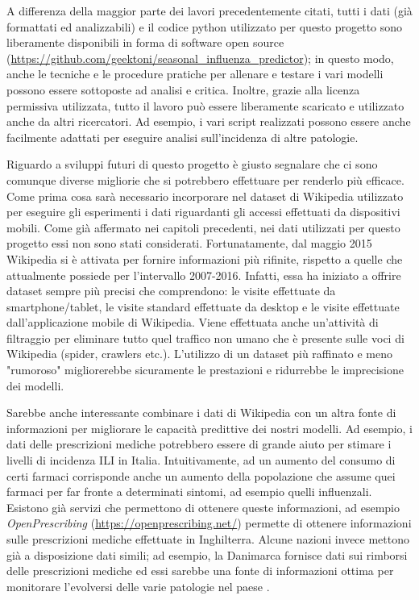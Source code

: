 A differenza della maggior parte dei lavori precedentemente citati, tutti i dati (già formattati ed analizzabili) e il codice 
python utilizzato per questo progetto sono liberamente disponibili in forma di software open source (\url{https://github.com/geektoni/seasonal_influenza_predictor}); in questo modo, 
anche le tecniche e le procedure pratiche per allenare e testare i vari modelli possono essere sottoposte ad analisi e 
critica. Inoltre, grazie alla licenza permissiva utilizzata, tutto il lavoro può essere liberamente scaricato e utilizzato 
anche da altri ricercatori. Ad esempio, i vari script realizzati possono essere anche facilmente adattati per eseguire
analisi sull'incidenza di altre patologie.
\bigskip

Riguardo a sviluppi futuri di questo progetto è giusto segnalare che ci sono comunque diverse migliorie che si potrebbero 
effettuare per renderlo più efficace. Come prima cosa sarà necessario incorporare nel dataset di 
Wikipedia utilizzato per eseguire gli esperimenti i dati riguardanti gli accessi effettuati da dispositivi mobili. 
Come già affermato nei capitoli precedenti, nei dati utilizzati per questo progetto essi non sono stati considerati. 
Fortunatamente, dal maggio 2015 Wikipedia si è attivata per fornire informazioni più rifinite, rispetto a quelle che 
attualmente possiede per l'intervallo 2007-2016. Infatti, essa ha iniziato a offrire dataset sempre più precisi che 
comprendono: le visite effettuate da smartphone/tablet, le visite standard effettuate da desktop e le visite 
effettuate dall'applicazione mobile di Wikipedia. Viene effettuata anche un'attività di filtraggio per eliminare tutto quel 
traffico non umano che è presente sulle voci di Wikipedia (spider, crawlers etc.). L'utilizzo di un dataset più raffinato e 
meno "rumoroso" migliorerebbe sicuramente le prestazioni e ridurrebbe le imprecisione dei modelli. 
\bigskip

Sarebbe anche interessante combinare i dati di Wikipedia con un altra fonte di informazioni per migliorare le capacità 
predittive dei nostri modelli. Ad esempio, i dati delle prescrizioni mediche potrebbero essere di grande aiuto per stimare i 
livelli di incidenza ILI in Italia. Intuitivamente, ad un aumento del consumo di certi farmaci corrisponde anche un aumento 
della popolazione che assume quei farmaci per far fronte a determinati sintomi, ad esempio quelli influenzali. Esistono già 
servizi che permettono di ottenere queste informazioni, ad esempio \textit{OpenPrescribing} 
(\url{https://openprescribing.net/}) permette di ottenere informazioni sulle prescrizioni mediche effettuate in 
Inghilterra. Alcune nazioni invece mettono già a disposizione dati simili; ad esempio, la Danimarca fornisce dati sui 
rimborsi delle prescrizioni mediche ed essi sarebbe una fonte di informazioni ottima per monitorare l'evolversi delle varie 
patologie nel paese \cite{sigrun2012}.
\bigskip

